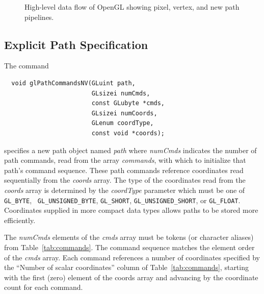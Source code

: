 \begin{figure}[t]
  \caption{\label{fig:pipelines} High-level data flow of OpenGL showing
  pixel, vertex, and new path pipelines.}
\end{figure}

\subsection{Explicit Path Specification}

The command
\begin{lstlisting}
  void glPathCommandsNV(GLuint path,
                        GLsizei numCmds,
                        const GLubyte *cmds,
                        GLsizei numCoords,
                        GLenum coordType,
                        const void *coords);
\end{lstlisting}
specifies a new path object named {\em path} where {\em numCmds} indicates
the number of path commands, read from the array {\em commands}, with
which to initialize that path's command sequence.  These path commands
reference coordinates read sequentially from the {\em coords} array.
The type of the coordinates read from the {\em coords} array is determined
by the {\em coordType} parameter which must be one of {\tt GL\_BYTE}, {\tt
GL\_UNSIGNED\_BYTE}, {\tt GL\_SHORT}, {\tt GL\_UNSIGNED\_SHORT}, or {\tt GL\_FLOAT}.
Coordinates supplied in more compact data types allows paths to be stored
more efficiently.

The {\em numCmds} elements of the {\em cmds} array must be tokens (or
character aliases) from Table~\ref{tab:commands}.  The command sequence
matches the element order of the {\em cmds} array.  Each command
references a number of coordinates specified by the ``Number of scalar
coordinates'' column of Table~\ref{tab:commands}, starting with the first
(zero) element of the coords array and advancing by the coordinate count
for each command.


